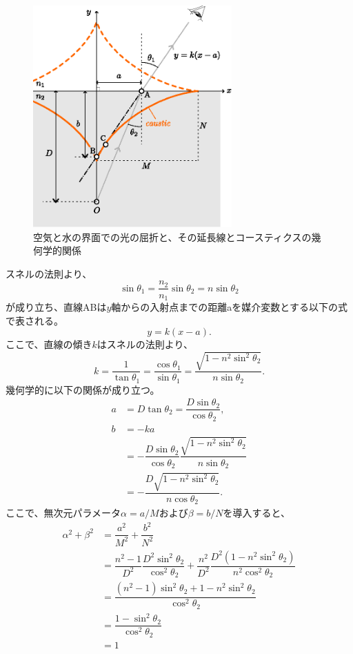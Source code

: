 \documentclass[twocolumn]{article}
\begin{document}
\begin{figure}
	\centering
	\includegraphics[width=3in]{figs/g237.eps}
	\caption{空気と水の界面での光の屈折と、その延長線とコースティクスの幾何学的関係}
	\label{fig:geometry}
\end{figure}
	
スネルの法則より、
$$ \sin\theta_1 = \frac{n_2}{n_1} \sin\theta_2 = n\sin\theta_2$$
が成り立ち、直線ABは$y$軸からの入射点までの距離aを媒介変数とする以下の式で表される。
$$y=k(x-a).$$
ここで、直線の傾き$k$はスネルの法則より、
$$k=\dfrac{1}{\tan\theta_1}=\dfrac{\cos\theta_1}{\sin\theta_1}
=\dfrac{\sqrt{1-n^2\sin^2\theta_2}}{n\sin\theta_2}.$$
幾何学的に以下の関係が成り立つ。
$$\begin{aligned}
	a &= D\tan\theta_2 = \dfrac{D\sin\theta_2}{\cos\theta_2},\\
	b &= -ka \\
	&= -\dfrac{D\sin\theta_2}{\cos\theta_2}
	\dfrac{\sqrt{1-n^2\sin^2\theta_2}}{n\sin\theta_2}\\
	&=-\dfrac{D\sqrt{1-n^2\sin^2\theta_2}}{n\cos\theta_2}.
\end{aligned}$$
ここで、無次元パラメータ$\alpha=a/M$および$\beta=b/N$を導入すると、
$$ \begin{aligned}
	\alpha^2 + \beta^2 &= \dfrac{a^2}{M^2}+\dfrac{b^2}{N^2}\\
	&=\dfrac{n^2-1}{D^2}\dfrac{D^2\sin^2\theta_2}{\cos^2\theta_2}%
	+\dfrac{n^2}{D^2}\dfrac{D^2(1-n^2\sin^2\theta_2)}{n^2\cos^2\theta_2}\\
	&=\dfrac{\left(n^2-1\right)\sin^2\theta_2 + 1-n^2\sin^2\theta_2}
	{\cos^2\theta_2}\\
	&=\dfrac{1-\sin^2\theta_2}{\cos^2\theta_2}\\
	&= 1
\end{aligned}$$
	
\end{document}
